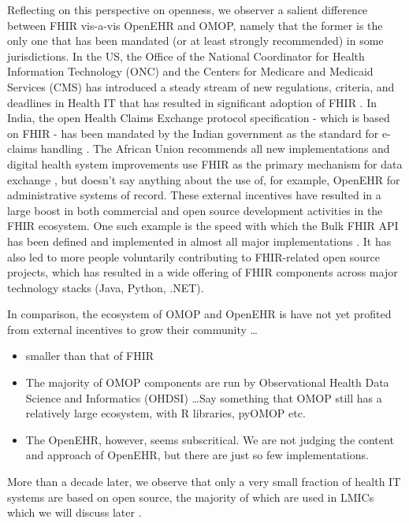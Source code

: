 \documentclass[
  authoryear]{elsarticle}
\providecommand{\tightlist}{%
  \setlength{\itemsep}{0pt}\setlength{\parskip}{0pt}}\usepackage{longtable,booktabs,array}
\begin{document}
Reflecting on this perspective on openness, we observer a salient
difference between FHIR vis-a-vis OpenEHR and OMOP, namely that the
former is the only one that has been mandated (or at least strongly
recommended) in some jurisdictions. In the US, the Office of the
National Coordinator for Health Information Technology (ONC) and the
Centers for Medicare and Medicaid Services (CMS) has introduced a steady
stream of new regulations, criteria, and deadlines in Health IT that has
resulted in significant adoption of FHIR \citep{firely2023fhir}. In
India, the open Health Claims Exchange protocol specification - which is
based on FHIR - has been mandated by the Indian government as the
standard for e-claims handling \citep{hcx}. The African Union recommends
all new implementations and digital health system improvements use FHIR
as the primary mechanism for data exchange \citep{tilahun2023african},
but doesn't say anything about the use of, for example, OpenEHR for
administrative systems of record. These external incentives have
resulted in a large boost in both commercial and open source development
activities in the FHIR ecosystem. One such example is the speed with
which the Bulk FHIR API has been defined and implemented in almost all
major implementations \citep{mandl2020push, jones2021landscape}. It has
also led to more people voluntarily contributing to FHIR-related open
source projects, which has resulted in a wide offering of FHIR
components across major technology stacks (Java, Python, .NET).

In comparison, the ecosystem of OMOP and OpenEHR is have not yet
profited from external incentives to grow their community \ldots{}

\begin{itemize}
\tightlist
\item
  smaller than that of FHIR
\item
  The majority of OMOP components are run by Observational Health Data
  Science and Informatics (OHDSI) \ldots Say something that OMOP still
  has a relatively large ecosystem, with R libraries, pyOMOP etc.
\item
  The OpenEHR, however, seems subscritical. We are not judging the
  content and approach of OpenEHR, but there are just so few
  implementations.
\end{itemize}

More than a decade later, we observe that only a very small fraction of
health IT systems are based on open source, the majority of which are
used in LMICs which we will discuss later \citep{digitalpublicgoods}.
\end{document}
